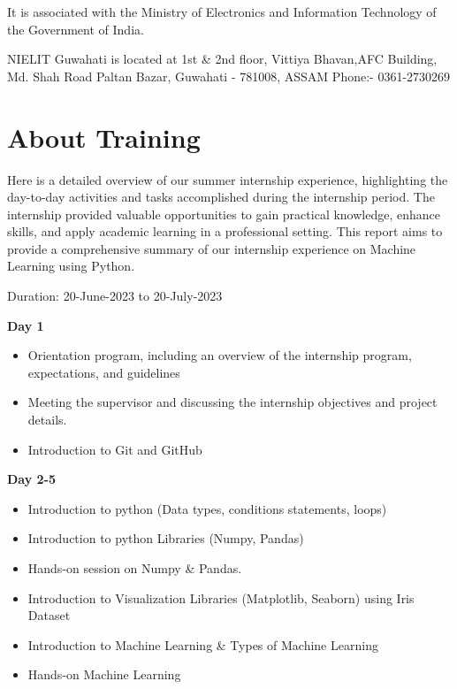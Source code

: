 It is associated with the Ministry of Electronics and Information Technology of the Government of India.\cite{enwiki:nielit} \par

NIELIT Guwahati is located at 1st \& 2nd floor, Vittiya Bhavan,AFC Building, Md. Shah Road Paltan Bazar, Guwahati - 781008, ASSAM Phone:- 0361-2730269

\section{About Training}
Here is a detailed overview of our summer internship experience, highlighting the day-to-day activities and tasks accomplished during the internship period. The internship provided valuable opportunities to gain practical knowledge, enhance skills, and apply academic learning in a professional setting. This report aims to provide a comprehensive summary of our internship experience on Machine Learning using Python.

Duration: 20-June-2023 to 20-July-2023

\textbf{Day 1}
\begin{itemize}
    \item Orientation program, including an overview of the internship program, expectations, and guidelines
    \item Meeting the supervisor and discussing the internship objectives and project details.
    \item Introduction to Git and GitHub
\end{itemize}

\textbf{Day 2-5}
\begin{itemize}
    \item Introduction to python (Data types, conditions statements, loops)
    \item Introduction to python Libraries (Numpy, Pandas)
    \item Hands-on session on Numpy \& Pandas.
    \item Introduction to Visualization Libraries (Matplotlib, Seaborn) using Iris Dataset
    \item Introduction to Machine Learning \& Types of Machine Learning
    \item Hands-on Machine Learning
\end{itemize}

